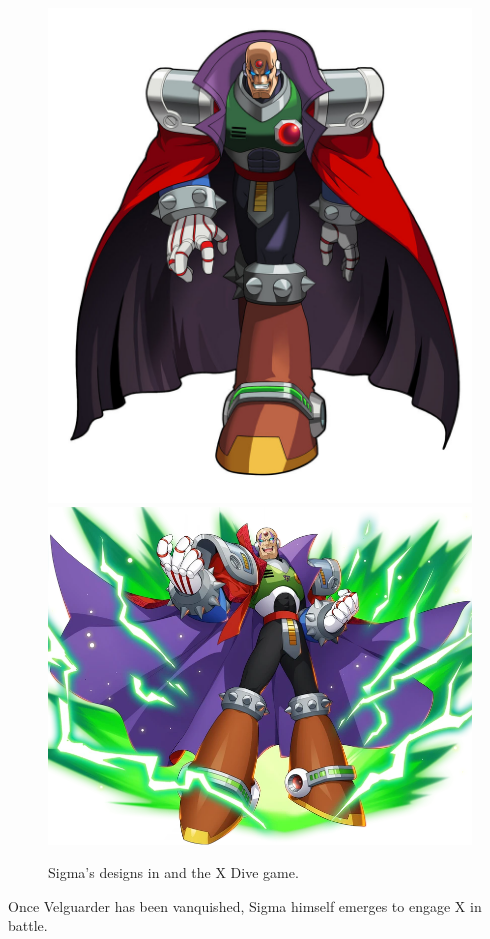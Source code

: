 \begin{figure}[htp]
	\includegraphics[height=\portraitsize]{figures/X1/Sigma_stages/MHXSigma.jpg}
	\includegraphics[height=\portraitsize]{figures/X1/Sigma_stages/X_DiVE_Sigma.png}
	\caption{Sigma's designs in \cite{book:MMX_Complete_art} and the X Dive game.}
\end{figure}
Once Velguarder has been vanquished, Sigma himself emerges to engage X in battle.

